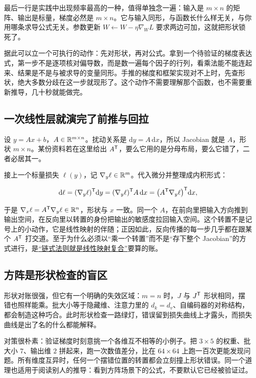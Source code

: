 最后一行是实践中出现频率最高的一种，值得单独念一遍：输入是 \(m\times n\) 的矩阵、输出是标量，梯度必然是 \(m\times n\)。它与输入同形，与函数长什么样无关，与你用哪条求导公式无关。参数更新 \(W\leftarrow W-\eta\nabla_W L\) 要求两边可加，这就把形状锁死了。

据此可以立一个可执行的动作：先对形状，再对公式。拿到一个待验证的梯度表达式，第一步不是逐项核对偏导数，而是数一遍每个因子的行列，看乘法能不能连起来、结果是不是与被求导的变量同形。手推的梯度和框架实现对不上时，先查形状，绝大多数分歧在这一步就现形了。这个动作不需要理解那个函数，也不需要重新推导，几十秒就能做完。

\subsection{一次线性层就演完了前推与回拉}

设 \(y=Ax+b\)，\(A\in\mathbb{R}^{m\times n}\)。扰动关系是 \(\mathrm dy=A\,\mathrm dx\)，所以 Jacobian 就是 \(A\)，形状 \(m\times n\)。某份资料若在这里给出 \(A^{\mathsf{T}}\)，要么它用的是分母布局，要么它错了，二者必居其一。

接上一个标量损失 \(\ell(y)\)，记 \(\nabla_y\ell\in\mathbb{R}^m\)。代入微分并整理成内积形式：

\[
\mathrm d\ell=(\nabla_y\ell)^{\mathsf{T}}\mathrm dy
=(\nabla_y\ell)^{\mathsf{T}}A\,\mathrm dx
=\bigl(A^{\mathsf{T}}\nabla_y\ell\bigr)^{\mathsf{T}}\mathrm dx,
\]

于是 \(\nabla_x\ell=A^{\mathsf{T}}\nabla_y\ell\in\mathbb{R}^n\)，形状与 \(x\) 一致。同一个 \(A\)，在前向里把输入方向推到输出空间，在反向里以转置的身份把输出的敏感度拉回输入空间。这个转置不是记号上的小动作，它是线性映射的伴随；正因如此，反向传播的每一步几乎都在跟某个 \(A^{\mathsf{T}}\) 打交道。至于为什么必须以``乘一个转置''而不是``存下整个 Jacobian''的方式进行，是\hyperref[sec:10-Matrix-Calculus/02-Differentials/02]{``链式法则就是线性映射复合''}要算的账。

\subsection{方阵是形状检查的盲区}

形状对账很强，但它有一个明确的失效区域：\(m=n\) 时，\(J\) 与 \(J^{\mathsf{T}}\) 形状相同，摆错也照样能乘。批大小等于隐藏维、注意力里的 \(d_k=d_v\)、自编码器的对称结构，都会制造这种巧合。此时形状检查一路绿灯，错误留到损失曲线上才露头，而损失曲线是出了名的什么都能解释。

对策很朴素：验证梯度时刻意挑一个各维互不相等的小例子。把 \(3\times 5\) 的权重、批大小 \(7\)、输出维 \(2\) 拼起来，跑一次数值差分，比在 \(64\times 64\) 上跑一百次更能发现问题。所有维度互异时，任何一个摆错位置的转置都会立刻撞上形状错误。同一个道理也适用于阅读别人的推导：看到方阵场景下的公式，不要默认它已经被验证过。

